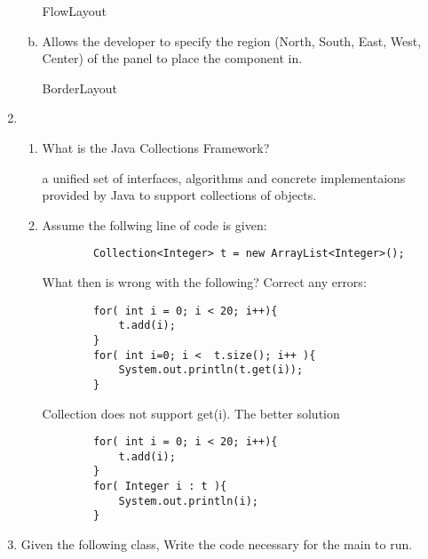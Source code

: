 \documentclass[11pt]{article}
\newenvironment{answer}{\large\lstset{basicstyle=\large}\color{white}}{}
\newenvironment{answer}{\large\lstset{basicstyle=\large}\color{red}}{}
\begin{document}
\begin{enumerate}
\begin{enumerate}[(a)]
\begin{answer}
FlowLayout
\vspace{.5in}
\end{answer}

\item Allows the developer to specify the region (North, South, East, West,
      Center) of the panel to place the component in.

\begin{answer}
BorderLayout
\vspace{.5in}
\end{answer}

\end{enumerate}

\item 
    \begin{enumerate} 
    \item What is the Java Collections Framework?

    \begin{answer}
        a unified set of interfaces, algorithms and concrete implementaions 
    provided by Java to support collections of objects.
    \end{answer}

    \item Assume the follwing line of code is given:
    \begin{lstlisting}
        Collection<Integer> t = new ArrayList<Integer>();
    \end{lstlisting}
    What then is wrong with the following? Correct any errors:
    \begin{lstlisting}
        for( int i = 0; i < 20; i++){
            t.add(i);
        }
        for( int i=0; i <  t.size(); i++ ){
            System.out.println(t.get(i));
        }
    \end{lstlisting}

    \begin{answer}
    Collection does not support get(i). The better solution 
    \begin{lstlisting}
        for( int i = 0; i < 20; i++){
            t.add(i);
        }
        for( Integer i : t ){
            System.out.println(i);
        }

    \end{lstlisting}
    \end{answer}

    \end{enumerate}
    
\pagebreak
\item Given the following class, Write the code necessary for the main to run.


\end{enumerate}
\end{document}
